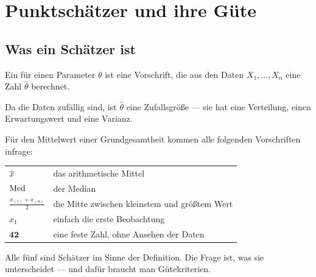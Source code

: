 \chapter{Punktschätzer und ihre Güte}

\section{Was ein Schätzer ist}

\begin{definition}
Ein  für einen Parameter $\theta$ ist eine Vorschrift, die aus den Daten $X_1,\ldots,X_n$ eine Zahl $\hat\theta$ berechnet.

Da die Daten zufällig sind, ist $\hat\theta$ eine Zufallsgröße --- sie hat eine Verteilung, einen Erwartungswert und eine Varianz.
\end{definition}

\begin{merksatz}
Für den Mittelwert einer Grundgesamtheit kommen alle folgenden Vorschriften infrage:

\begin{center}
{\small
\renewcommand{\arraystretch}{1.5}
\begin{tabular}{@{}P{3.4cm}P{5.0cm}@{}}
\toprule
$\overline{x}$ & das arithmetische Mittel\\
$\operatorname{Med}$ & der Median\\
$\frac{x_{(1)}+x_{(n)}}{2}$ & die Mitte zwischen kleinstem und größtem Wert\\
$x_1$ & einfach die erste Beobachtung\\
$\mathbf{42}$ & eine feste Zahl, ohne Ansehen der Daten\\
\bottomrule
\end{tabular}}
\end{center}

Alle fünf sind Schätzer im Sinne der Definition. Die Frage ist, was sie unterscheidet --- und dafür braucht man Gütekriterien.

\begin{center}
\begin{minipage}{0.88\textwidth}
\end{minipage}
\end{center}
\end{merksatz}

